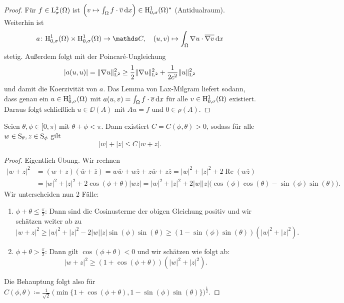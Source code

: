\begin{proof}
  Für $f \in \mathrm{L}_\sigma^2(\Omega)$ ist $\Big( v \mapsto \int_\Omega f \cdot \overline v \, {\operatorname{d}\!{x}} \Big) \in \mathrm{H}_{0,\sigma}^1(\Omega)^*$ (Antidualraum).
  Weiterhin ist 
  $$
  a \colon \HH_{0,\sigma}^1(\Omega) \times \HH_{0,\sigma}^1(\Omega) \to \C,\quad (u,v) \mapsto \int_\Omega \nabla u \cdot \overline{\nabla v} \d x
  $$ 
  stetig.
  Außerdem folgt mit der Poincar\'e-Ungleichung
  $$
  |a(u,u)| = \|\nabla u\|_{\mathrm{L}^2}^2 \geq \frac{1}{2} \|\nabla u\|_{\mathrm{L}^2}^2 + \frac{1}{2 c^2} \|u\|_{\mathrm{L}^2}^2
  $$
  und damit die Koerzivität von $a$.
  Das Lemma von Lax-Milgram liefert sodann, dass genau ein $u \in \mathrm{H}_{0,\sigma}^1(\Omega)$ mit $a(u,v) = \int_\Omega f \cdot \overline v \, {\operatorname{d}\!{x}}$ für alle $v \in \mathrm{H}_{0,\sigma}^1(\Omega)$ existiert.
  Daraus folgt schließlich $u \in \DD(A)$ mit $A u = f$ und $0 \in \rho(A)$.
\end{proof}

\begin{lem}
  \label{lem:inverseTriangle}
  Seien $\theta, \phi \in [0,\pi)$ mit $\theta + \phi < \pi$.
    Dann existiert $C = C(\phi,\theta) > 0$, sodass für alle $w \in \mathrm{S}_\theta, z \in \mathrm{S}_\phi$ gilt
    $$
    |w| + |z| \leq C \,|w + z|.
    $$
\end{lem}

\begin{proof}
  Eigentlich Übung. Wir rechnen
  \begin{align*}
    |w + z|^2 
    &= (w + z)(\overline w + \overline z)  
    = w \overline w + w \overline z + z \overline w + z \overline z 
    = |w|^2 + |z|^2 + 2 \operatorname{Re}(w \overline z) \\
    &= |w|^2 + |z|^2 + 2 \cos (\phi + \theta) |w \overline z|
    = |w|^2 + |z|^2 + 2|w||z| \big(\cos(\phi)\cos(\theta) - \sin(\phi)\sin(\theta)\big).
  \end{align*}
  Wir unterscheiden nun 2 Fälle:
  \begin{enumerate}[1.]
    \item $\phi +  \theta \leq \frac{\pi}{2}$: Dann sind die Cosinusterme der obigen Gleichung positiv und wir schätzen weiter ab zu
      $$
      |w + z|^2 \geq |w|^2 + |z|^2 - 2|w||z|\sin(\phi)\sin(\theta) \geq (1 - \sin(\phi)\sin(\theta)) (|w|^2 + |z|^2).
      $$
    \item $\phi + \theta > \frac{\pi}{2}$: Dann gilt $\cos(\phi + \theta) < 0$ und wir schätzen wie folgt ab:
      $$
      |w + z|^2 \geq (1 + \cos(\phi + \theta)) (|w|^2 + |z|^2 ).
      $$
  \end{enumerate}
  Die Behauptung folgt also für $C(\phi,\theta) \coloneqq \frac{1}{\sqrt{2}}\, \Big(\min\{1 + \cos(\phi + \theta), 1 - \sin(\phi)\sin(\theta)\}\Big)^{\frac{1}{2}}$.
\end{proof}

